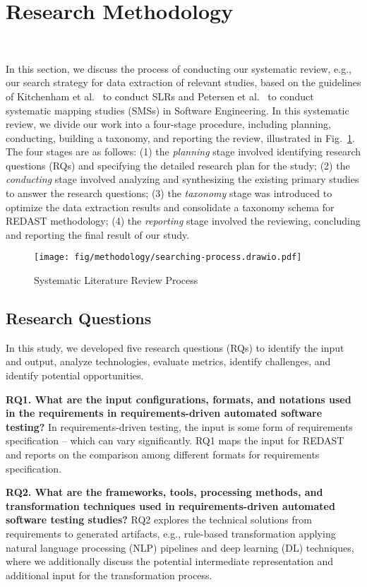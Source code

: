 \section{Research Methodology}~\label{sec:Methodology}

In this section, we discuss the process of conducting our systematic review, e.g., our search strategy for data extraction of relevant studies, based on the guidelines of Kitchenham et al.~\cite{kitchenham2022segress} to conduct SLRs and Petersen et al.~\cite{PETERSEN20151} to conduct systematic mapping studies (SMSs) in Software Engineering. In this systematic review, we divide our work into a four-stage procedure, including planning, conducting, building a taxonomy, and reporting the review, illustrated in Fig.~\ref{fig:search}. The four stages are as follows: (1) the \emph{planning} stage involved identifying research questions (RQs) and specifying the detailed research plan for the study; (2) the \emph{conducting} stage involved analyzing and synthesizing the existing primary studies to answer the research questions; (3) the \emph{taxonomy} stage was introduced to optimize the data extraction results and consolidate a taxonomy schema for REDAST methodology; (4) the \emph{reporting} stage involved the reviewing, concluding and reporting the final result of our study.

\begin{figure}[!t]
    \centering
    \texttt{[image: fig/methodology/searching-process.drawio.pdf]}
    \caption{Systematic Literature Review Process}
    \label{fig:search}
\end{figure}

\subsection{Research Questions}
In this study, we developed five research questions (RQs) to identify the input and output, analyze technologies, evaluate metrics, identify challenges, and identify potential opportunities. 

\textbf{RQ1. What are the input configurations, formats, and notations used in the requirements in requirements-driven
automated software testing?} In requirements-driven testing, the input is some form of requirements specification -- which can vary significantly. RQ1 maps the input for REDAST and reports on the comparison among different formats for requirements specification.

\textbf{RQ2. What are the frameworks, tools, processing methods, and transformation techniques used in requirements-driven automated software testing studies?} RQ2 explores the technical solutions from requirements to generated artifacts, e.g., rule-based transformation applying natural language processing (NLP) pipelines and deep learning (DL) techniques, where we additionally discuss the potential intermediate representation and additional input for the transformation process.

